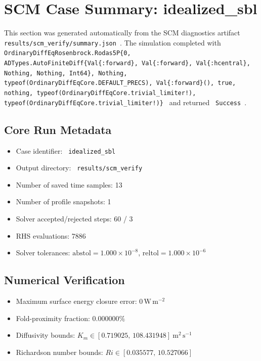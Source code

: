 \section{SCM Case Summary: idealized\_sbl}
\label{sec:scm_case_scm_verify_idealized_sbl_40x4m_0h_report}

This section was generated automatically from the SCM diagnostics artifact
\texttt{ results/scm\_verify/summary.json }. The simulation completed with \texttt{ OrdinaryDiffEqRosenbrock.Rodas5P\{0, ADTypes.AutoFiniteDiff\{Val\{:forward\}, Val\{:forward\}, Val\{:hcentral\}, Nothing, Nothing, Int64\}, Nothing, typeof(OrdinaryDiffEqCore.DEFAULT\_PRECS), Val\{:forward\}(), true, nothing, typeof(OrdinaryDiffEqCore.trivial\_limiter!), typeof(OrdinaryDiffEqCore.trivial\_limiter!)\} }
and returned \texttt{ Success }.

\subsection{Core Run Metadata}
\begin{itemize}
  \item Case identifier: \texttt{ idealized\_sbl }
  \item Output directory: \texttt{ results/scm\_verify }
  \item Number of saved time samples: 13
  \item Number of profile snapshots: 1
  \item Solver accepted/rejected steps: 60 / 3
  \item RHS evaluations: 7886
  \item Solver tolerances: $\mathrm{abstol}=1.000 \times 10^{-8}$, $\mathrm{reltol}=1.000 \times 10^{-6}$
\end{itemize}

\subsection{Numerical Verification}
\begin{itemize}
  \item Maximum surface energy closure error:
  $0\,\mathrm{W\,m^{-2}}$
  \item Fold-proximity fraction:
  $0.000000\%$
  \item Diffusivity bounds:
  $K_m \in [0.719025,\,108.431948]~\mathrm{m^2\,s^{-1}}$
  \item Richardson number bounds:
  $Ri \in [0.035577,\,10.527066]$
\end{itemize}


